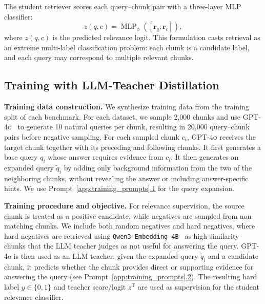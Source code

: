 \documentclass{llmxive}
\begin{document}
The student retriever scores each query--chunk pair with a three-layer MLP classifier:
\begin{equation}
    z(q,c) =
    \operatorname{MLP}_{\phi}([\mathbf{r}_q ; \mathbf{r}_c]),
\end{equation}
where $z(q,c)$ is the predicted relevance logit. This formulation casts retrieval as an extreme multi-label classification problem: each chunk is a candidate label, and each query may correspond to multiple relevant chunks.

\subsection{Training with LLM-Teacher Distillation}
\label{sec:training}

\noindent
\textbf{Training data construction. }
We synthesize training data from the training split of each benchmark. For each dataset, we sample 2{,}000 chunks and use \textsc{GPT-4o}~\cite{openai2024gpt4o} to generate 10 natural queries per chunk, resulting in 20{,}000 query--chunk pairs before negative sampling. For each sampled chunk $c_i$, \textsc{GPT-4o} receives the target chunk together with its preceding and following chunks. It first generates a base query $q_i$ whose answer requires evidence from $c_i$. It then generates an expanded query $\tilde{q}_i$ by adding only background information from the two of the neighboring chunks, without revealing the answer or including answer-specific hints. We use Prompt~\hyperref[app:training_prompts]{\ref*{app:training_prompts}.1} for the query expansion.

\noindent
\textbf{Training procedure and objective. }
For relevance supervision, the source chunk is treated as a positive candidate, while negatives are sampled from non-matching chunks. We include both random negatives and hard negatives, where hard negatives are retrieved using \texttt{Qwen3-Embedding-4B}~\cite{zhang2025qwen3embeddingadvancingtext} as high-similarity chunks that the LLM teacher judges as not useful for answering the query. GPT-4o is then used as an LLM teacher: given the expanded query $\tilde{q}_i$ and a candidate chunk, it predicts whether the chunk provides direct or supporting evidence for answering the query (see Prompt~\hyperref[app:training_prompts]{\ref*{app:training_prompts}.2}). The resulting hard label $y \in \{0,1\}$ and teacher score/logit $z^{\mathrm{T}}$ are used as supervision for the student relevance classifier.
\end{document}
